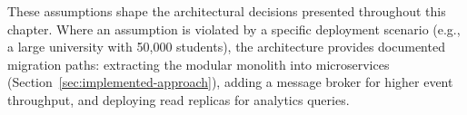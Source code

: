 These assumptions shape the architectural decisions presented throughout this chapter. Where an assumption is violated by a specific deployment scenario (e.g., a large university with 50,000 students), the architecture provides documented migration paths: extracting the modular monolith into microservices (Section~\ref{sec:implemented-approach}), adding a message broker for higher event throughput, and deploying read replicas for analytics queries.
